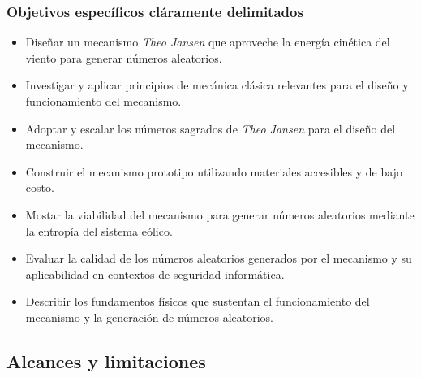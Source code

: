 \subsubsection{Objetivos específicos cláramente delimitados}
\begin{itemize}
  \item Diseñar un mecanismo \textit{Theo Jansen} que aproveche la energía cinética del viento para generar números aleatorios.
  \item Investigar y aplicar principios de mecánica clásica relevantes para el diseño y funcionamiento del mecanismo.
  \item Adoptar y escalar los números sagrados de \textit{Theo Jansen} para el diseño del mecanismo.
  \item Construir el mecanismo prototipo utilizando materiales accesibles y de bajo costo.
  \item Mostar la viabilidad del mecanismo para generar números aleatorios mediante la entropía del sistema eólico.
  \item Evaluar la calidad de los números aleatorios generados por el mecanismo y su aplicabilidad en contextos de seguridad informática.
  \item Describir los fundamentos físicos que sustentan el funcionamiento del mecanismo y la generación de números aleatorios.
\end{itemize}
  

\subsection{Alcances y limitaciones}

